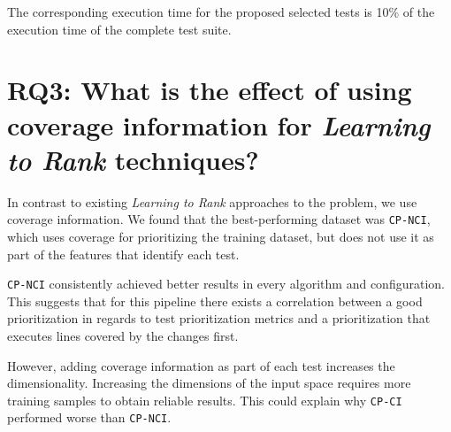 The corresponding execution time for the proposed selected tests  is 10\% of the execution time
of the complete test suite.

\section{RQ3: What is the effect of using coverage information for \emph{Learning to Rank} techniques?}

In contrast to existing \emph{Learning to Rank} approaches to the problem,
we use coverage information. We found that the best-performing dataset was \texttt{CP-NCI},
which uses coverage for prioritizing the training dataset, but does not use it as part
of the features that identify each test. 

\texttt{CP-NCI} consistently achieved better results in every algorithm and
configuration. This suggests that for this pipeline there exists a correlation between a good prioritization
in regards to test prioritization metrics and a prioritization that executes lines covered by the changes first. 

However, adding coverage information as part of each test increases the dimensionality. Increasing the dimensions of the input 
space requires more training samples to obtain reliable results. This could explain why \texttt{CP-CI} performed worse than \texttt{CP-NCI}.

%